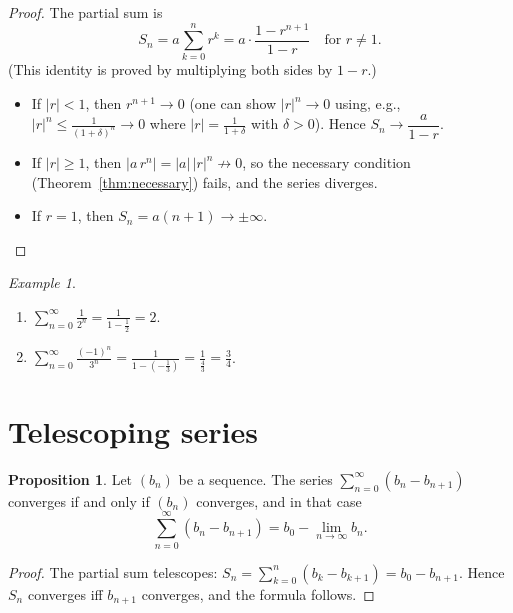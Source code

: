 \documentclass[12pt,a4paper,openany]{book}
\newcommand{\abs}[1]{\left\lvert #1 \right\rvert}
\theoremstyle{definition}
\newtheorem{proposition}{Proposition}[chapter]
\theoremstyle{remark}
\newtheorem{example}{Example}[chapter]
\begin{document}
\begin{proof}
The partial sum is
\[
   S_n = a\sum_{k=0}^{n} r^k
       = a \cdot \frac{1 - r^{n+1}}{1 - r}
       \quad\text{for } r \neq 1.
\]
(This identity is proved by multiplying both sides by $1-r$.)

\begin{itemize}
\item If $\abs{r} < 1$, then $r^{n+1} \to 0$ (one can show $\abs{r}^n \to 0$
      using, e.g., $\abs{r}^n \leq \frac{1}{(1+\delta)^n} \to 0$ where
      $\abs{r} = \frac{1}{1+\delta}$ with $\delta > 0$).
      Hence $S_n \to \dfrac{a}{1 - r}$.
\item If $\abs{r} \geq 1$, then $\abs{a\,r^n} = \abs{a}\,\abs{r}^n
      \not\to 0$, so the necessary condition (Theorem~\ref{thm:necessary})
      fails, and the series diverges.
\item If $r = 1$, then $S_n = a(n+1) \to \pm\infty$. \qedhere
\end{itemize}
\end{proof}

\begin{example}\label{ex:geometric-examples}
\leavevmode
\begin{enumerate}
\item $\displaystyle\sum_{n=0}^{\infty}\frac{1}{2^n}
      = \frac{1}{1-\frac{1}{2}} = 2$.
\item $\displaystyle\sum_{n=0}^{\infty}\frac{(-1)^n}{3^n}
      = \frac{1}{1-(-\frac{1}{3})} = \frac{1}{\frac{4}{3}} = \frac{3}{4}$.
\end{enumerate}
\end{example}

\section{Telescoping series}\label{sec:telescoping}

\begin{proposition}\label{prop:telescoping}
Let $(b_n)$ be a sequence. The series
$\displaystyle\sum_{n=0}^{\infty}(b_n - b_{n+1})$ converges if and only if
$(b_n)$ converges, and in that case
\[
   \sum_{n=0}^{\infty}(b_n - b_{n+1}) = b_0 - \lim_{n\to\infty} b_n.
\]
\end{proposition}

\begin{proof}
The partial sum telescopes:
$S_n = \sum_{k=0}^{n}(b_k - b_{k+1}) = b_0 - b_{n+1}$.
Hence $S_n$ converges iff $b_{n+1}$ converges, and the formula follows.
\end{proof}
\end{document}
